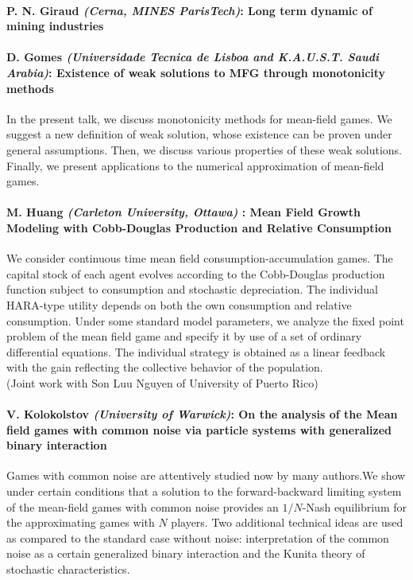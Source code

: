 \documentclass[11pt]{article}
\begin{document}
\paragraph{ P. N. Giraud  {\sl (Cerna, MINES ParisTech)}:
   Long term dynamic of mining industries  }

\paragraph{ D. Gomes {\sl (Universidade Tecnica de Lisboa and  K.A.U.S.T. Saudi Arabia)}:
Existence of weak solutions to MFG through monotonicity methods}
In the present talk, we discuss monotonicity methods for mean-field
 games. We suggest a new definition of weak solution, whose existence 
can be proven under general assumptions. Then, we discuss various 
properties of these weak solutions. Finally, we present applications to 
the numerical approximation of mean-field games.  

\paragraph{  M. Huang {\sl (Carleton University, Ottawa) }:
 Mean Field Growth Modeling with Cobb-Douglas Production and Relative Consumption  }
We consider continuous time mean field consumption-accumulation 
games. The capital stock of each agent evolves according to the 
Cobb-Douglas production function subject to consumption and stochastic 
depreciation. The individual HARA-type utility depends on both the own 
consumption and relative consumption. Under some standard model 
parameters, we analyze the fixed point problem of the mean field game 
and specify it by use of a set of ordinary differential equations. The 
individual strategy is obtained as a linear feedback with the gain 
reflecting the collective behavior of the population. \\
(Joint work with 
Son Luu Nguyen of University of Puerto Rico)

\paragraph{ V. Kolokolstov {\sl(University of Warwick)}:
 On the analysis of the Mean field games with common noise via particle systems with generalized binary interaction }
Games with common noise are attentively studied now by many 
authors.We show under certain conditions that a solution
to the forward-backward limiting system of the mean-field games with 
common noise provides an $1/N$-Nash equilibrium for
the approximating games with $N$ players. Two additional technical ideas
 are used as compared to the standard case without noise: interpretation
 of the common noise as a certain generalized binary interaction and the
 Kunita theory of stochastic characteristics.
\end{document}
